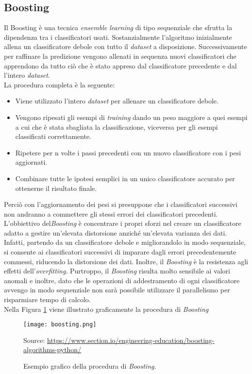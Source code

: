\subsection{Boosting}
Il Boosting \textit{\cite{freund1996experiments}} è una tecnica \emph{ensemble learning} di tipo sequenziale che sfrutta la dipendenza tra i classificatori usati. Sostanzialmente l'algoritmo inizialmente allena un classificatore debole con tutto il \emph{dataset} a disposizione. Successivamente per raffinare la predizione vengono allenati in sequenza nuovi classificatori che apprendono da tutto ciò che è stato appreso dal classificatore precedente e dal l'intero \emph{dataset}.\\
La procedura completa è la seguente:
\begin{itemize}
	\item Viene utilizzato l'intero \emph{dataset} per allenare un classificatore debole.
	\item Vengono ripesati gli esempi di \emph{training} dando un peso maggiore a quei esempi a cui che è stata sbagliata la classificazione, viceversa per gli esempi classificati correttamente.
	\item Ripetere per n volte i passi precedenti con un nuovo classificatore con i pesi aggiornati.
	\item Combinare tutte le ipotesi semplici in un unico classificatore accurato per ottenerne il risultato finale.
\end{itemize}
Perciò con l'aggiornamento dei pesi si presuppone che i classificatori successivi non andranno a commettere gli stessi errori dei classificatori precedenti.\\
L'obbiettivo del\emph{Boosting} è concentrare i propri sforzi nel creare un classificatore adatto a gestire un'elevata distorsione anziché un'elevata varianza dei dati. Infatti, partendo da un classificatore debole e migliorandolo in modo sequenziale, si consente ai classificatori successivi di imparare dagli errori precedentemente commessi, riducendo la distorsione dei dati. Inoltre, il \emph{Boosting} è la resistenza agli effetti dell'\emph{overfitting}.
Purtroppo, il \emph{Boosting} risulta molto sensibile ai valori anomali e inoltre, dato che le operazioni di addestramento di ogni classificatore avvengo in modo sequenziale non sarà possibile utilizzare il parallelismo per risparmiare tempo di calcolo.\\
Nella Figura \ref{fig:boosting} viene illustrato graficamente la procedura di \emph{Boosting}

\begin{figure}[]
	\begin{center}
		\texttt{[image: boosting.png]}
		\caption{Esempio grafico della procedura di \emph{Boosting}.
		} 
		Source: \url{https://www.section.io/engineering-education/boosting-algorithms-python/}\label{fig:boosting}
	\end{center}
\end{figure}
